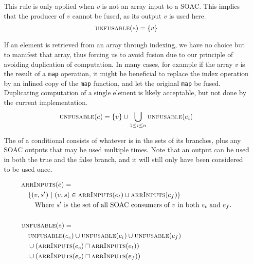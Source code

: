 \begin{description}[style=nextline]
\item[Case $e \equiv v$]

  This rule is only applied when $v$ is not an array input to a SOAC.
  This implies that the producer of $v$ cannot be fused, as its output
  $v$ is used here.
\begin{align*}
  & \textsc{unfusable}(e) = \{v\} \\
\end{align*}

\item[Case $e \equiv \texttt{$v$[$e_{1}$, \ldots, $e_{n}$]}$]

  If an element is retrieved from an array through indexing, we have
  no choice but to manifest that array, thus forcing us to avoid
  fusion due to our principle of avoiding duplication of computation.
  In many cases, for example if the array $v$ is the result of a
  \texttt{map} operation, it might be beneficial to replace the index
  operation by an inlined copy of the \texttt{map} function, and let
  the original \texttt{map} be fused.  Duplicating computation of a
  single element is likely acceptable, but not done by the current
  implementation. 
  \begin{align*}
  & \textsc{unfusable}(e) = \{v\} \cup \bigcup_{1\leq i \leq n}\textsc{unfusable}(e_{i}) \\
\end{align*}

\item[Case $e \equiv \texttt{if $e_{c}$ then $e_{t}$ else $e_{f}$}$]

  The \unfusable{} of a conditional consists of whatever is in the
  \unfusable{} sets of its branches, plus any SOAC outputs that may be
  used multiple times.  Note that an output can be used in both the
  true and the false branch, and it will still only have been
  considered to be used once.

\begin{align*}
  & \textsc{arrInputs}(e) =\\
  & \quad \{ (v,s')\ |\ (v,s) \in \textsc{arrInputs}(e_{t}) \cup \textsc{arrInputs}(e_{f}) \}\\
  & \quad\quad \text{Where $s'$ is the set of all SOAC consumers of $v$ in both $e_{t}$ and $e_{f}$.} \\
  \\
  & \textsc{unfusable}(e) =\\
  & \quad \textsc{unfusable}(e_{c}) \cup \textsc{unfusable}(e_{t}) \cup \textsc{unfusable}(e_{f})\\
  & \quad \cup (\textsc{arrInputs}(e_{c}) \sqcap \textsc{arrInputs}(e_{t}))\\
  & \quad \cup (\textsc{arrInputs}(e_{c}) \sqcap \textsc{arrInputs}(e_{f}))\\
\end{align*}


\end{description}
